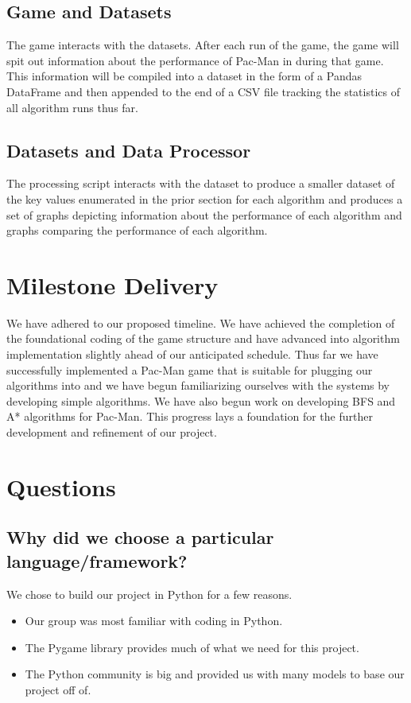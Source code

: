 \documentclass[12pt]{article}
\begin{document}
    \subsection*{Game and Datasets}
      The game interacts with the datasets. After each run of the game, the game will spit out information about the performance of Pac-Man in during that game. This information will be compiled into a dataset in the form of a Pandas DataFrame and then appended to the end of a CSV file tracking the statistics of all algorithm runs thus far.
    \subsection*{Datasets and Data Processor}
      The processing script interacts with the dataset to produce a smaller dataset of the key values enumerated in the prior section for each algorithm and produces a set of graphs depicting information about the performance of each algorithm and graphs comparing the performance of each algorithm.
  \section*{Milestone Delivery}
    We have adhered to our proposed timeline. We have achieved the completion of the foundational coding of the game structure and have advanced into algorithm implementation slightly ahead of our anticipated schedule. Thus far we have successfully implemented a Pac-Man game that is suitable for plugging our algorithms into and we have begun familiarizing ourselves with the systems by developing simple algorithms. We have also begun work on developing BFS and A* algorithms for Pac-Man. This progress lays a foundation for the further development and refinement of our project.
  \section*{Questions}
    \subsection*{Why did we choose a particular language/framework?}
      We chose to build our project in Python for a few reasons.
      \begin{itemize}
        \itemsep-4pt
        \item Our group was most familiar with coding in Python.
        \item The Pygame library provides much of what we need for this project.
        \item The Python community is big and provided us with many models to base our project off of.
      \end{itemize}
    
\end{document}
